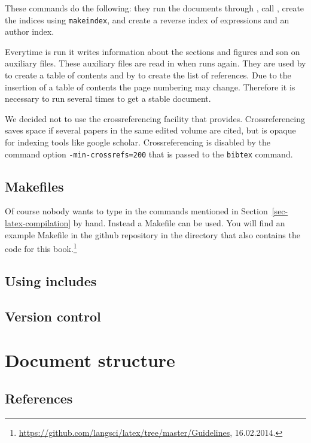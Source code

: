 \noindent
These commands do the following: they run the documents through \xelatex, call \bibtex, create the
indices using \texttt{makeindex}, and create a reverse index of expressions and an author index.

Everytime \xelatex is run it writes information about the sections and figures and son on auxiliary
files. These auxiliary files are read in when \xelatex runs again. They are used by \xelatex to create a
table of contents and by \bibtex to create the list of references. Due to the insertion of a table of
contents the page numbering may change. Therefore it is necessary to run \xelatex several times to
get a stable document.

We decided not to use the crossreferencing facility that \bibtex provides. Crossreferencing saves
space if several papers in the same edited volume are cited, but is opaque for indexing tools like
google scholar. Crossreferencing is disabled by the command option \verb+-min-crossrefs=200+ that is
passed to the \texttt{bibtex} command.

\subsection{Makefiles}

Of course nobody wants to type in the commands mentioned in Section~\ref{sec-latex-compilation} by
hand. Instead a Makefile can be used. You will find an example Makefile in the
github repository in the directory that also contains the code for this book.\footnote{
  \url{https://github.com/langsci/latex/tree/master/Guidelines}, 16.02.2014.
}


\subsection{Using includes}

\subsection{Version control}


\section{Document structure}




\subsection{References}

